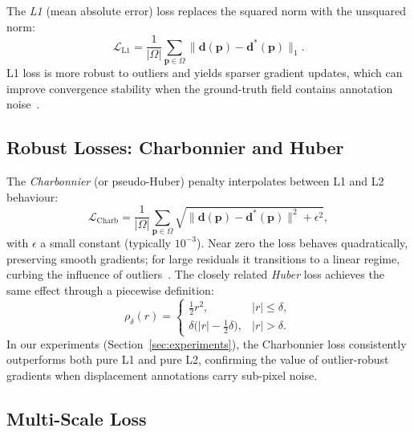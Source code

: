 The \emph{L1} (mean absolute error) loss replaces the squared norm with the
unsquared norm:
%
\begin{equation}
  \mathcal{L}_{\text{L1}}
  = \frac{1}{|\Omega|}\sum_{\mathbf{p}\in\Omega}
    \lVert \mathbf{d}(\mathbf{p}) - \mathbf{d}^{*}(\mathbf{p}) \rVert_{1}.
  \label{eq:l1}
\end{equation}
%
L1 loss is more robust to outliers and yields sparser gradient updates, which
can improve convergence stability when the ground-truth field contains
annotation noise~\cite{sun2018pwcnet}.

\subsection{Robust Losses: Charbonnier and Huber}
\label{ssec:robust}

The \emph{Charbonnier} (or pseudo-Huber) penalty interpolates between L1 and
L2 behaviour:
%
\begin{equation}
  \mathcal{L}_{\text{Charb}}
  = \frac{1}{|\Omega|}\sum_{\mathbf{p}\in\Omega}
    \sqrt{\lVert \mathbf{d}(\mathbf{p}) - \mathbf{d}^{*}(\mathbf{p})\rVert^{2}
          + \epsilon^{2}},
  \label{eq:charbonnier}
\end{equation}
%
with $\epsilon$ a small constant (typically $10^{-3}$).  Near zero the loss
behaves quadratically, preserving smooth gradients; for large residuals it
transitions to a linear regime, curbing the influence of
outliers~\cite{sun2014quantitative}.  The closely related \emph{Huber} loss
achieves the same effect through a piecewise definition:
%
\begin{equation}
  \rho_{\delta}(r) =
  \begin{cases}
    \tfrac{1}{2}r^{2}, & |r| \le \delta, \\
    \delta\bigl(|r| - \tfrac{1}{2}\delta\bigr), & |r| > \delta.
  \end{cases}
  \label{eq:huber}
\end{equation}
%
In our experiments (Section~\ref{sec:experiments}), the Charbonnier loss
consistently outperforms both pure L1 and pure L2, confirming the value of
outlier-robust gradients when displacement annotations carry sub-pixel noise.

\subsection{Multi-Scale Loss}
\label{ssec:multiscale}

